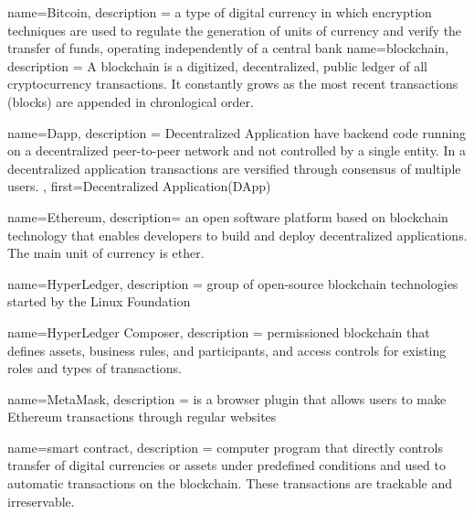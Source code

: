 {
	name={Bitcoin},
	description ={
		a type of digital currency in which encryption techniques are used to regulate the generation of units of currency and verify the transfer of funds, operating independently of a central bank
	}
}
{
	name={blockchain},
	description ={
		A blockchain is a digitized, decentralized, public ledger of all cryptocurrency transactions.  It constantly grows as the most recent transactions (blocks) are appended in chronlogical order.
	}
}


{
	name={Dapp},
	description ={
		Decentralized Application have backend code running on a decentralized peer-to-peer network and not controlled by a single entity. In a decentralized application transactions are versified through consensus of multiple users.
	},
	first={Decentralized Application(DApp)}
}

{
	name={Ethereum},
	description={
		an open software platform based on blockchain technology that enables developers to build and deploy decentralized applications. The main unit of currency is ether.
	}
}

{
	name={HyperLedger},
	description ={
		group of open-source blockchain technologies started by the Linux Foundation
	}
}

{
	name={HyperLedger Composer},
	description ={
		permissioned blockchain that defines assets, business rules, and participants, and access controls for existing roles and types of transactions.
	}
}

{
	name={MetaMask},
	description ={
		is a browser plugin that allows users to make Ethereum transactions through regular websites
	}
}



{
	name={smart contract},
	description ={
		computer program that directly controls transfer of digital currencies or assets under predefined conditions and used to automatic transactions on the blockchain. These transactions are trackable and irreservable.
	}
}

